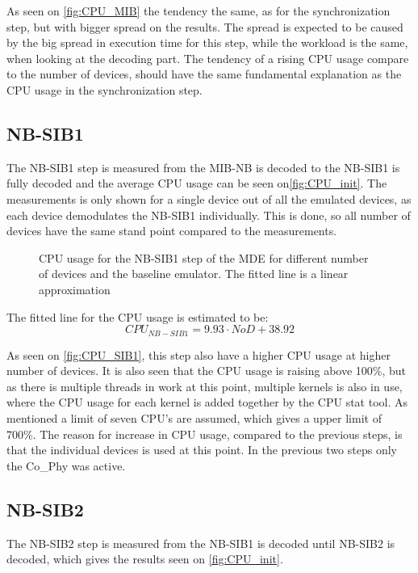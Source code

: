 As seen on \autoref{fig:CPU_MIB} the tendency the same, as for the synchronization step, but with bigger spread on the results. The spread is expected to be caused by the big spread in execution time for this step, while the workload is the same, when looking at the decoding part. The tendency of a rising CPU usage compare to the number of devices, should have the same fundamental explanation as the CPU usage in the synchronization step.

\subsection{NB-SIB1}
The NB-SIB1 step is measured from the MIB-NB is decoded to the NB-SIB1 is fully decoded and the average CPU usage can be seen on\autoref{fig:CPU_init}. The measurements is only shown for a single device out of all the emulated devices, as each device demodulates the NB-SIB1 individually. This is done, so all number of devices have the same stand point compared to the measurements.


\begin{figure}[H]
\centering
\resizebox{0.5\textwidth}{!}{
}
\caption{CPU usage for the NB-SIB1 step of the MDE for different number of devices and the baseline emulator. The fitted line is a linear approximation}
\label{fig:CPU_SIB1}
\end{figure}

The fitted line for the CPU usage is estimated to be:
\begin{equation}
CPU_{NB-SIB1} = 9.93 \cdot NoD + 38.92
\end{equation}

As seen on \autoref{fig:CPU_SIB1}, this step also have a higher CPU usage at higher number of devices. It is also seen that the CPU usage is raising above 100\%, but as there is multiple threads in work at this point, multiple kernels is also in use, where the CPU usage for each kernel is added together by the CPU stat tool. As mentioned a limit of seven CPU's are assumed, which gives a upper limit of 700\%. The reason for increase in CPU usage, compared to the previous steps, is that the individual devices is used at this point. In the previous two steps only the Co\_Phy was active.

\subsection{NB-SIB2}
The NB-SIB2 step is measured from the NB-SIB1 is decoded until NB-SIB2 is decoded, which gives the results seen on \autoref{fig:CPU_init}. 

